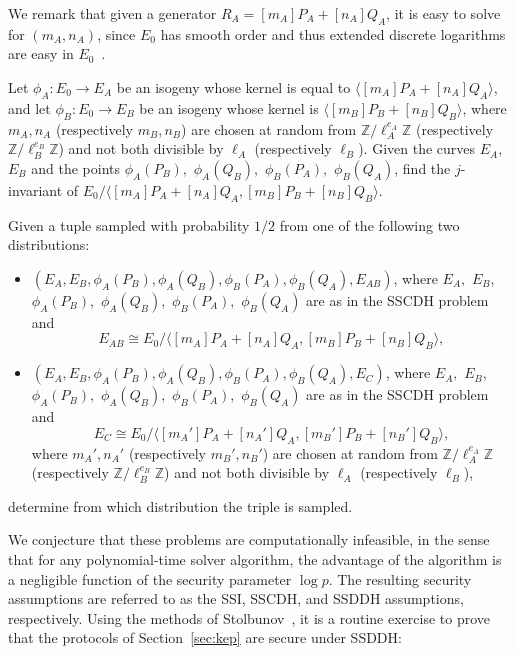 \documentclass[envcountsect,envcountsame,runningheads]{llncs}   %
\newcommand{\ZZ}{{\mathbb{Z}}}
\newcommand{\iso}{\cong}
\newcommand{\cyc}[1]{{\langle #1 \rangle}}
\begin{document}
We remark that given a generator $R_A = [m_A]P_A+[n_A]Q_A$, it is easy
to solve for $(m_A,n_A)$, since $E_0$ has smooth order and thus
extended discrete logarithms are easy in $E_0$~\cite{teske-ph}.

\begin{problem} Let $\phi_A \colon E_0 \to E_A$ be an isogeny
  whose kernel is equal to $\cyc{[m_A]P_A+[n_A]Q_A}$, and let $\phi_B \colon
  E_0 \to E_B$ be an isogeny whose kernel is
  $\cyc{[m_B]P_B+[n_B]Q_B}$, where $m_A,n_A$ (respectively $m_B,n_B$)
  are chosen at random from $\ZZ/\ell_A^{e_A}\ZZ$ (respectively
  $\ZZ/\ell_B^{e_B}\ZZ$) and not both divisible by $\ell_A$ (respectively
  $\ell_B$). Given the curves $E_A,$ $E_B$ and the points
  $\phi_A(P_B),$ $\phi_A(Q_B),$ $\phi_B(P_A),$ $\phi_B(Q_A)$, find the
  $j$-invariant of $E_0/\cyc{[m_A]P_A+[n_A]Q_A ,[m_B]P_B+[n_B]Q_B}$.
\end{problem}

\begin{problem} Given a tuple sampled with probability $1/2$ from one of
  the following two distributions:
\begin{itemize} 
\item $(E_A, E_B, \phi_A(P_B), \phi_A(Q_B), \phi_B(P_A), \phi_B(Q_A),
  E_{AB})$, where $E_A,$ $E_B$, $\phi_A(P_B),$ $\phi_A(Q_B),$
  $\phi_B(P_A),$ $\phi_B(Q_A)$ are as in the SSCDH problem and \[E_{AB} \iso
  E_0/\cyc{[m_A]P_A+[n_A]Q_A ,[m_B]P_B+[n_B]Q_B},\]
\item $(E_A, E_B, \phi_A(P_B), \phi_A(Q_B), \phi_B(P_A), \phi_B(Q_A),
  E_C)$, where $E_A,$ $E_B$, $\phi_A(P_B),$ $\phi_A(Q_B),$
  $\phi_B(P_A),$ $\phi_B(Q_A)$ are as in the SSCDH problem and \[E_{C} \iso
  E_0/\cyc{[m_A']P_A+[n_A']Q_A ,[m_B']P_B+[n_B']Q_B},\] where
  $m_A',n_A'$ (respectively $m_B',n_B'$) are chosen at random from
  $\ZZ/\ell_A^{e_A}\ZZ$ (respectively $\ZZ/\ell_B^{e_B}\ZZ$) and not both
  divisible by $\ell_A$ (respectively $\ell_B$),
\end{itemize}
determine from which distribution the triple is sampled.
\end{problem}

We conjecture that these problems are computationally infeasible, in
the sense that for any polynomial-time solver algorithm, the advantage
of the algorithm is a negligible function of the security parameter
$\log p$. The resulting security assumptions are referred to as the
SSI, SSCDH, and SSDDH assumptions, respectively. Using the methods
of Stolbunov~\cite{stolbunov-red}, it is a routine exercise to prove
that the protocols of Section~\ref{sec:kep} are secure under SSDDH:
\end{document}
